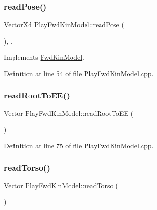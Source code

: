 \mbox{\label{classPlayFwdKinModel_a282700bc69b26e6ea28cc5048881a599}} 
\subsubsection{\texorpdfstring{read\+Pose()}{readPose()}}
{\footnotesize\ttfamily Vector\+Xd Play\+Fwd\+Kin\+Model\+::read\+Pose (\begin{DoxyParamCaption}{ }\end{DoxyParamCaption})\hspace{0.3cm}{\ttfamily [override]}, {\ttfamily [protected]}, {\ttfamily [virtual]}}



Implements \hyperlink{classFwdKinModel_aaad9ff96f725fc529672e12aed86dc02}{Fwd\+Kin\+Model}.



Definition at line 54 of file Play\+Fwd\+Kin\+Model.\+cpp.

\mbox{\label{classPlayFwdKinModel_a97e565b16712bb26a41fc78c4d1fca89}} 
\subsubsection{\texorpdfstring{read\+Root\+To\+E\+E()}{readRootToEE()}}
{\footnotesize\ttfamily Vector Play\+Fwd\+Kin\+Model\+::read\+Root\+To\+EE (\begin{DoxyParamCaption}{ }\end{DoxyParamCaption})\hspace{0.3cm}{\ttfamily [protected]}}



Definition at line 75 of file Play\+Fwd\+Kin\+Model.\+cpp.

\mbox{\label{classPlayFwdKinModel_a04170578030a5db53f7af45876b11492}} 
\subsubsection{\texorpdfstring{read\+Torso()}{readTorso()}}
{\footnotesize\ttfamily Vector Play\+Fwd\+Kin\+Model\+::read\+Torso (\begin{DoxyParamCaption}{ }\end{DoxyParamCaption})\hspace{0.3cm}{\ttfamily [protected]}}



